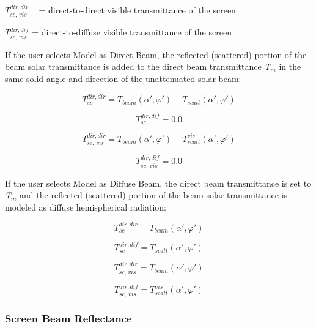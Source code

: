 \(T_{sc,\,vis}^{dir,dir}\) ~ = direct-to-direct visible transmittance of the screen

\(T_{sc,\,vis}^{dir,dif}\) = direct-to-diffuse visible transmittance of the screen

If the user selects Model as Direct Beam, the reflected (scattered) portion of the beam solar transmittance is added to the direct beam transmittance \emph{T\(_{m}\)} in the same solid angle and direction of the unattenuated solar beam:

\begin{equation}
T_{sc}^{dir,dir} = {T_{beam}}\left( {\alpha ',\varphi '} \right) + {T_{scatt}}\left( {\alpha ',\varphi '} \right)
\end{equation}

\begin{equation}
T_{sc}^{dir,dif} = 0.0
\end{equation}

\begin{equation}
T_{sc,\,vis}^{dir,dir} = {T_{beam}}\left( {\alpha ',\varphi '} \right) + T_{scatt}^{vis}\left( {\alpha ',\varphi '} \right)
\end{equation}

\begin{equation}
T_{sc,\,vis}^{dir,dif} = 0.0
\end{equation}

If the user selects Model as Diffuse Beam, the direct beam transmittance is set to \emph{T\(_{m}\)} and the reflected (scattered) portion of the beam solar transmittance is modeled as diffuse hemispherical radiation:

\begin{equation}
T_{sc}^{dir,dir} = {T_{beam}}\left( {\alpha ',\varphi '} \right)
\end{equation}

\begin{equation}
T_{sc}^{dir,dif} = {T_{scatt}}\left( {\alpha ',\varphi '} \right)
\end{equation}

\begin{equation}
T_{sc,\,vis}^{dir,dir} = {T_{beam}}\left( {\alpha ',\varphi '} \right)
\end{equation}

\begin{equation}
T_{sc,\,vis}^{dir,dif} = T_{scatt}^{vis}\left( {\alpha ',\varphi '} \right)
\end{equation}

\subsubsection{Screen Beam Reflectance}\label{screen-beam-reflectance}

